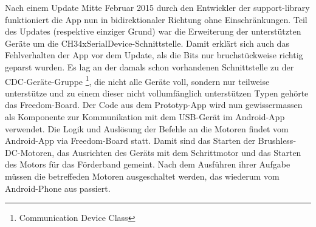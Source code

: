 \newline
Nach einem Update Mitte Februar 2015 durch den Entwickler der support-library funktioniert die App nun 
in bidirektionaler Richtung ohne Einschränkungen. Teil des Updates (respektive einziger Grund) war die 
Erweiterung der unterstützten Geräte um die CH34xSerialDevice-Schnittstelle. Damit erklärt sich auch das 
Fehlverhalten der  App vor dem Update, als die Bits nur bruchstückweise richtig geparst wurden. Es lag 
an der damals schon vorhandenen Schnittstelle zu der CDC-Geräte-Gruppe \footnote{Communication Device Class}, 
die nicht alle Geräte voll, sondern nur teilweise unterstütze und zu einem dieser nicht vollumfänglich 
unterstützen Typen gehörte das Freedom-Board. \newline
Der Code aus dem  Prototyp-App wird nun gewissermassen als Komponente zur Kommunikation mit dem USB-Gerät
im Android-App verwendet. 
\newline
\newline
Die Logik und Auslösung der Befehle an die Motoren findet vom Android-App via Freedom-Board statt. Damit 
sind das Starten der Brushless-DC-Motoren, das Ausrichten des Geräts mit dem Schrittmotor und das Starten 
des Motors für das Förderband gemeint. Nach dem Ausführen ihrer Aufgabe müssen die betreffeden Motoren 
ausgeschaltet werden, das wiederum vom Android-Phone aus passiert.
